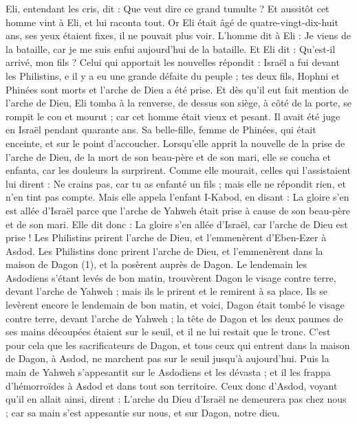\begin{multicols}{2}
Eli, entendant les cris, dit : Que veut dire ce grand tumulte ? Et aussitôt cet homme vint à Eli, et lui raconta tout.
Or Eli était âgé de quatre-vingt-dix-huit ans, ses yeux étaient fixes, il ne pouvait plus voir.
L’homme dit à Eli : Je viens de la bataille, car je me suis enfui aujourd'hui de la bataille. Et Eli dit : Qu'est-il arrivé, mon fils ?
Celui qui apportait les nouvelles répondit : Israël a fui devant les Philistins, e il y a eu une grande défaite du peuple ; tes deux fils, Hophni et Phinées sont morts et l'arche de Dieu a été prise.
Et dès qu'il eut fait mention de l'arche de Dieu, Eli tomba à la renverse, de dessus son siège, à côté de la porte, se rompit le cou et mourut ; car cet homme était vieux et pesant. Il avait été juge en Israël pendant quarante ans.
Sa belle-fille, femme de Phinées, qui était enceinte, et sur le point d'accoucher. Lorsqu’elle apprit la nouvelle de la prise de l'arche de Dieu, de la mort de son beau-père et de son mari, elle se coucha et enfanta, car les douleurs la surprirent.
Comme elle mourait, celles qui l'assistaient lui dirent : Ne crains pas, car tu as enfanté un fils ; mais elle ne répondit rien, et n'en tint pas compte.
Mais elle appela l'enfant I-Kabod, en disant : La gloire s’en est allée d'Israël parce que l'arche de Yahweh était prise à cause de son beau-père et de son mari.
Elle dit donc : La gloire s’en allée d'Israël, car l'arche de Dieu est prise !
\VerseOne{}Les Philistins prirent l'arche de Dieu, et l'emmenèrent d'Eben-Ezer à Asdod.
Les Philistins donc prirent l'arche de Dieu, et l'emmenèrent dans la maison de Dagon (1), et la posèrent auprès de Dagon.
Le lendemain les Asdodiens s'étant levés de bon matin, trouvèrent Dagon le visage contre terre, devant l'arche de Yahweh ; mais ils le prirent et le remirent à sa place.
Ils se levèrent encore le lendemain de bon matin, et voici, Dagon était tombé le visage contre terre, devant l'arche de Yahweh ; la tête de Dagon et les deux paumes de ses mains découpées étaient sur le seuil, et il ne lui restait que le tronc.
C'est pour cela que les sacrificateurs de Dagon, et tous ceux qui entrent dans la maison de Dagon, à Asdod, ne marchent pas sur le seuil jusqu'à aujourd'hui.
Puis la main de Yahweh s'appesantit sur le Asdodiens et les dévasta ; et il les frappa d’hémorroïdes à Asdod et dans tout son territoire.
Ceux donc d'Asdod, voyant qu'il en allait ainsi, dirent : L'arche du Dieu d'Israël ne demeurera pas chez nous ; car sa main s’est appesantie sur nous, et sur Dagon, notre dieu.

\end{multicols}
